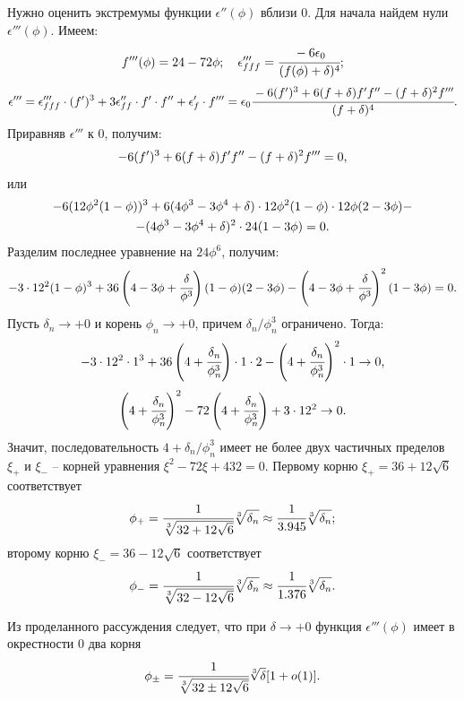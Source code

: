 Нужно оценить экстремумы функции $\epsilon''(\phi)$ вблизи $0$. Для начала найдем нули $\epsilon'''(\phi)$. Имеем:
$$f'''(\phi) = 24 - 72 \phi; \quad \epsilon'''_{fff} = \cfrac{-6 \epsilon_0}{(f(\phi) + \delta)^4} {\text{;}}$$
\begin{equation}
    \epsilon''' = \epsilon'''_{fff} \cdot (f')^3 + 3 \epsilon''_{ff} \cdot f' \cdot f'' + \epsilon'_f \cdot f''' = \epsilon_0 \cfrac{-6 (f')^3 + 6 (f + \delta) f' f'' - (f + \delta)^2 f'''}{(f + \delta)^4} {\text{.}}
    \label{eq:epsilon_phi_phi_phi}
\end{equation}
Приравняв $\epsilon'''$ к $0$, получим:
$$-6 (f')^3 + 6 (f + \delta) f' f'' - (f + \delta)^2 f''' = 0 {\text{,}}$$
или
\begin{multline*}
    -6(12 \phi^2 (1 - \phi))^3 + 6(4 \phi^3 - 3\phi^4 + \delta) \cdot 12 \phi^2 (1 - \phi) \cdot 12 \phi (2 - 3\phi) - \\ - (4 \phi^3 - 3 \phi^4 + \delta)^2 \cdot 24 (1 - 3 \phi) = 0 {\text{.}}
\end{multline*}
Разделим последнее уравнение на $24\phi^6$, получим:
$$-3 \cdot 12^2 (1 - \phi)^3 + 36 \left(4 - 3\phi + \cfrac{\delta}{\phi^3} \right)(1 - \phi)(2 - 3\phi) - \left(4 - 3 \phi + \cfrac{\delta}{\phi^3} \right)^2 (1 - 3 \phi) = 0 {\text{.}}$$
Пусть $\delta_n \to +0$ и корень $\phi_n \to +0$, причем $\delta_n / \phi_n^3$ ограничено. Тогда:
$$-3 \cdot 12^2 \cdot 1^3 + 36 \left(4 + \cfrac{\delta_n}{\phi_n^3} \right) \cdot 1 \cdot 2 - \left(4 + \cfrac{\delta_n}{\phi_n^3} \right)^2 \cdot 1 \to 0 {\text{,}}$$
$$\left(4 + \cfrac{\delta_n}{\phi_n^3} \right)^2 - 72 \left(4 + \cfrac{\delta_n}{\phi_n^3} \right) + 3 \cdot 12^2 \to 0 {\text{.}}$$
Значит, последовательность $4 + \delta_n / \phi_n^3$ имеет не более двух частичных пределов $\xi_+$ и $\xi_-$ -- корней уравнения $\xi^2 - 72 \xi + 432 = 0$. Первому корню $\xi_+ = 36 + 12 \sqrt{6}$ соответствует
$$\phi_+ = \cfrac{1}{\sqrt[3]{32 + 12 \sqrt{6}}} \sqrt[3]{\delta_n} \approx \cfrac{1}{3.945} \sqrt[3]{\delta_n} {\text{;}}$$
второму корню $\xi_- = 36 - 12 \sqrt{6}$ соответствует
$$\phi_- = \cfrac{1}{\sqrt[3]{32 - 12 \sqrt{6}}} \sqrt[3]{\delta_n} \approx \cfrac{1}{1.376} \sqrt[3]{\delta_n} {\text{.}}$$

Из проделанного рассуждения следует, что при $\delta \to +0$ функция $\epsilon'''(\phi)$ имеет в окрестности $0$ два корня
\begin{equation}
    \phi_{\pm} = \cfrac{1}{\sqrt[3]{32 \pm 12 \sqrt{6}}} \sqrt[3]{\delta} [1 + o(1)] {\text{.}}
    \label{eq:epsilon_phi_phi_phi_roots}
\end{equation}

